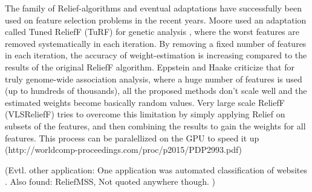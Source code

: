 The family of Relief-algorithms and eventual adaptations have successfully been used on feature selection problems in the recent years. Moore used an adaptation called Tuned ReliefF (TuRF) for genetic analysis \cite{Moore:07}, where the worst features are removed systematically in each iteration. By removing a fixed number of features in each iteration, the accuracy of weight-estimation is increasing compared to the results of the original ReliefF algorithm. Eppstein and Haake \cite{Eppstein:08} criticize that for truly genome-wide association analysis, where a huge number of features is used (up to hundreds of thousands), all the proposed methods don't scale well and the estimated weights become basically random values. Very large scale ReliefF (VLSReliefF) tries to overcome this limitation by simply applying Relief on subsets of the features, and then combining the results to gain the weights for all features. This process can be paralellized on the GPU to speed it up \cite{} (http://worldcomp-proceedings.com/proc/p2015/PDP2993.pdf)

(Evtl. other application: One application was automated classification of websites \cite{Jin:07}. Also found: ReliefMSS, Not quoted anywhere though. )

